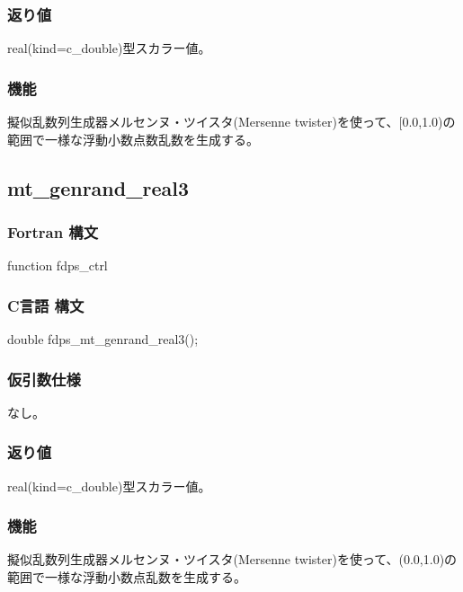 \subsubsection*{返り値}
real(kind=c\_double)型スカラー値。

\subsubsection*{機能}
擬似乱数列生成器メルセンヌ・ツイスタ(Mersenne twister)を使って、[0.0,1.0)の範囲で一様な浮動小数点数乱数を生成する。
\clearpage

\subsection{mt\_genrand\_real3}
\subsubsection*{Fortran 構文}
\begin{screen}
\begin{spverbatim}
function fdps_ctrl%
\end{spverbatim}
\end{screen}

\subsubsection*{C言語 構文}
\begin{screen}
\begin{spverbatim}
double fdps_mt_genrand_real3();
\end{spverbatim}
\end{screen}

\subsubsection*{仮引数仕様}
なし。

\subsubsection*{返り値}
real(kind=c\_double)型スカラー値。

\subsubsection*{機能}
擬似乱数列生成器メルセンヌ・ツイスタ(Mersenne twister)を使って、(0.0,1.0)の範囲で一様な浮動小数点乱数を生成する。
\clearpage

